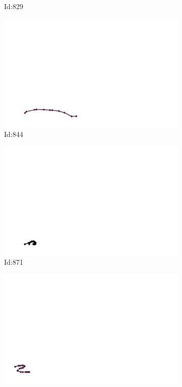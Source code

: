 \documentclass[12pt,twoside]{report}
\begin{document}
\begin{figure}
\begin{subfigure}[b]{0.20\textwidth}
\caption{Id:829}
\end{subfigure}
\begin{subfigure}[b]{0.20\textwidth}
\centering
\includegraphics[width=\textwidth]{../trajectories/844.png}
\caption{Id:844}
\end{subfigure}
\begin{subfigure}[b]{0.20\textwidth}
\centering
\includegraphics[width=\textwidth]{../trajectories/871.png}
\caption{Id:871}
\end{subfigure}
\begin{subfigure}[b]{0.20\textwidth}
\centering
\includegraphics[width=\textwidth]{../trajectories/872.png}

\end{subfigure}
\end{figure}
\end{document}
